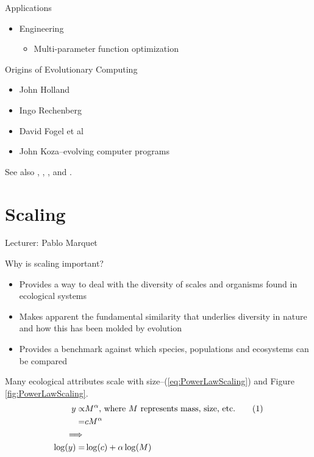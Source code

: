 \documentclass[]{article}
\newcommand\numberthis{\addtocounter{equation}{1}\tag{\theequation}}
\begin{document}
Applications
\begin{itemize}
	\item  Engineering
	\begin{itemize}
		\item 	Multi-parameter function optimization\cite{marshall2014evolution}
	\end{itemize}
\end{itemize}

Origins of Evolutionary Computing

\begin{itemize}
	\item John Holland \cite{holland1992adaptation}
	\item Ingo Rechenberg \cite{rechenberg1965cybernetic}
	\item David Fogel et al\cite{fogel1998artificial}
	\item John Koza--evolving computer programs\cite{koza1992genetic}
\end{itemize}

See also \cite{mitchell1998introduction}, \cite{eiben2003introduction}, \cite{forrest1993genetic}, and \cite{ma2014novo}.



\section{Scaling}

Lecturer: Pablo Marquet

Why is scaling important?

\begin{itemize}
	\item Provides a way to deal with the diversity of scales and
	organisms found in ecological systems
	\item Makes apparent the fundamental similarity that
	underlies diversity in nature and how this has been
	molded by evolution
	\item Provides a benchmark against which species,
	populations and ecosystems can be compared
\end{itemize}

Many ecological attributes scale with size--(\ref{eq:PowerLawScaling}) and Figure \ref{fig:PowerLawScaling}.
\begin{align*}
	y \propto& M^{\alpha}\text{, where $M$ represents mass, size, etc.}\numberthis\label{eq:PowerLawScaling}\\
	=& c M^{\alpha}\\
	\implies&\\
	\log(y)=&\log(c) + \alpha \log(M)
\end{align*}
\end{document}
